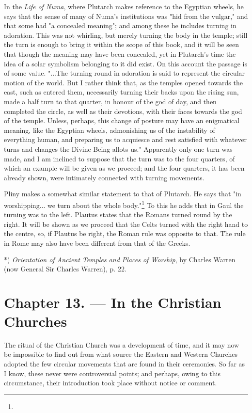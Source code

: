 \documentclass[a4paper, 11pt, oneside, polutonikogreek, english]{article}
\begin{document}
In the \emph{Life of Numa}, where Plutarch makes reference to the Egyptian wheels, he says that the sense of many of Numa's institutions was "hid from the vulgar," and that some had "a concealed meaning"; and among these he includes turning in adoration. This was not whirling, but merely turning the body in the temple; still the turn is enough to bring it within the scope of this book, and it will be seen that though the meaning may have been concealed, yet in Plutarch's time the idea of a solar symbolism belonging to it did exist. On this account the passage is of some value. "...The turning round in adoration is said to represent the circular motion of the world. But I rather think that, as the temples opened towards the east, such as entered them, necessarily turning their backs upon the rising sun, made a half turn to that quarter, in honour of the god of day, and then completed the circle, as well as their devotions, with their faces towards the god of the temple. Unless, perhaps, this change of posture may have an enigmatical meaning, like the Egyptian wheels, admonishing us of the instability of everything human, and preparing us to acquiesce and rest satisfied with whatever turns and changes the Divine Being allots us." Apparently only one turn was made, and I am inclined to suppose that the turn was to the four quarters, of which an example will be given as we proceed; and the four quarters, it has been already shown, were intimately connected with turning movements.

Pliny makes a somewhat similar statement to that of Plutarch. He says that "in worshipping... we turn about the whole body."\footnote{} To this he adds that in Gaul the turning was to the left. Plautus states that the Romans turned round by the right. It will be shown as we proceed that the Celts turned with the right hand to the centre, so, if Plautus be right, the Roman rule was opposite to that. The rule in Rome may also have been different from that of the Greeks.

*) \emph{Orientation of Ancient Temples and Places of Worship}, by Charles Warren (now General Sir Charles Warren), p. 22.
\clearpage
\section{Chapter 13. --- In the Christian Churches}
\paragraph{}
The ritual of the Christian Church was a development of time, and it may now be impossible to find out from what source the Eastern and Western Churches adopted the few circular movements that are found in their ceremonies. So far as I know, these never were controversial points; and perhaps, owing to this circumstance, their introduction took place without notice or comment.
\end{document}
